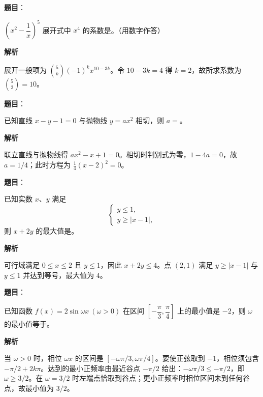 \begin{answer}

\textbf{题目}：

$\left(x^2-\dfrac1x\right)^5$ 展开式中 $x^4$ 的系数是\gkblank{}。（用数字作答）

\textbf{解析}

展开一般项为 $\binom5k(-1)^k x^{10-3k}$。令 $10-3k=4$ 得 $k=2$，故所求系数为 $\binom52=10$。


\end{answer}
\begin{answer}

\textbf{题目}：

已知直线 $x-y-1=0$ 与抛物线 $y=ax^2$ 相切，则 $a=$\gkblank{}。

\textbf{解析}

联立直线与抛物线得 $ax^2-x+1=0$。相切时判别式为零，$1-4a=0$，故 $a=1/4$；此时方程为 $\frac14(x-2)^2=0$。


\end{answer}
\begin{answer}

\textbf{题目}：

已知实数 $x\text{、}y$ 满足
\nopagebreak[4]
\[
\begin{cases}
y\le 1,\\
y\ge |x-1|,
\end{cases}
\]
则 $x+2y$ 的最大值是\gkblank{}。

\textbf{解析}

可行域满足 $0\le x\le2$ 且 $y\le1$，因此 $x+2y\le4$。点 $(2,1)$ 满足 $y\ge|x-1|$ 与 $y\le1$ 并达到等号，最大值为 $4$。


\end{answer}
\begin{answer}

\textbf{题目}：

已知函数 $f(x)=2\sin\omega x\ (\omega>0)$ 在区间 $\left[-\dfrac\pi3,\dfrac\pi4\right]$ 上的最小值是 $-2$，则 $\omega$ 的最小值等于\gkblank{}。

\textbf{解析}

当 $\omega>0$ 时，相位 $\omega x$ 的区间是 $[-\omega\pi/3,\omega\pi/4]$。要使正弦取到 $-1$，相位须包含 $-\pi/2+2k\pi$。达到的最小正频率由最近谷点 $-\pi/2$ 给出：$-\omega\pi/3\le-\pi/2$，即 $\omega\ge3/2$。在 $\omega=3/2$ 时左端点恰取到谷点；更小正频率时相位区间未到任何谷点，故最小值为 $3/2$。


\end{answer}
